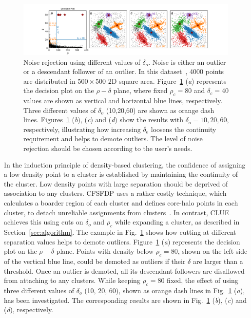 \begin{figure}[ht]
    \centering
    \includegraphics[trim=3.5cm 0cm 3.5cm 0cm, clip,width=0.99\textwidth]{chapters/HGCal/figures/clue/Figure4.pdf}
    \caption{ Noise rejection using different values of $\delta_o$. Noise is either an outlier or a descendant follower of an outlier. In this dataset~\cite{rodriguez2014clustering}, 4000 points are distributed in $500\times500$ 2D square area. Figure~\ref{fig:performance:outlierCuts} (\emph{a}) represents the decision plot on the $\rho-\delta$ plane, where fixed $\rho_c=80$ and $\delta_c=40$ values are shown as vertical and horizontal blue lines, respectively. Three different values of $\delta_o$ (10,20,60) are shown as orange dash lines. Figures~\ref{fig:performance:outlierCuts} (\emph{b}), (\emph{c}) and (\emph{d}) show the results with $\delta_o=10,20,60$, respectively, illustrating how increasing $\delta_o$ loosens the continuity requirement and helps to demote outliers. The level of noise rejection  should be chosen according to the user's needs.}
    \label{fig:performance:outlierCuts}
\end{figure}

In the induction principle of density-based clustering, the confidence of assigning a low density point to a cluster is established by maintaining the continuity of the cluster. Low density points with large separation should be deprived of association to any clusters. CFSFDP uses a rather costly technique, which calculates a boarder region of each cluster and defines core-halo points in each cluster, to detach unreliable assignments from clusters~\cite{rodriguez2014clustering}. In contrast, CLUE achieves this using cuts on $\delta_o$ and $\rho_c$ while expanding a cluster, as described in Section~\ref{sec:algorithm}. The example in Fig.~\ref{fig:performance:outlierCuts} shows how cutting at different separation values helps to demote outliers. Figure~\ref{fig:performance:outlierCuts} (\emph{a}) represents the decision plot on the $\rho-\delta$ plane. Points with density below $\rho_c=80$, shown on the left side of the vertical blue line, could be demoted as outliers if their $\delta$ are larger than a threshold. Once an outlier is demoted, all its descendant followers are disallowed from attaching to any clusters. While keeping $\rho_c=80$ fixed, the effect of using three different values of $\delta_o$ (10, 20, 60), shown as orange dash lines in Fig.~\ref{fig:performance:outlierCuts} (\emph{a}), has been investigated. The corresponding results are shown in Fig.~\ref{fig:performance:outlierCuts} (\emph{b}),  (\emph{c}) and (\emph{d}), respectively.


